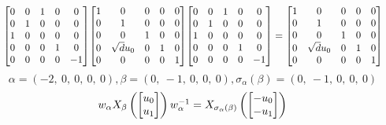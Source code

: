\documentclass[11pt]{article}
\theoremstyle{definition}
\begin{document}
\[
\scaletoalign{\textwidth}{{\left[\begin{matrix}0 & 0 & 1 & 0 & 0\\0 & 1 & 0 & 0 & 0\\1 & 0 & 0 & 0 & 0\\0 & 0 & 0 & 1 & 0\\0 & 0 & 0 & 0 & -1\end{matrix}\right]} {\left[\begin{matrix}1 & 0 & 0 & 0 & 0\\0 & 1 & 0 & 0 & 0\\0 & 0 & 1 & 0 & 0\\0 & \sqrt{d} u_{0} & 0 & 1 & 0\\0 & 0 & 0 & 0 & 1\end{matrix}\right]} {\left[\begin{matrix}0 & 0 & 1 & 0 & 0\\0 & 1 & 0 & 0 & 0\\1 & 0 & 0 & 0 & 0\\0 & 0 & 0 & 1 & 0\\0 & 0 & 0 & 0 & -1\end{matrix}\right]} = {\left[\begin{matrix}1 & 0 & 0 & 0 & 0\\0 & 1 & 0 & 0 & 0\\0 & 0 & 1 & 0 & 0\\0 & \sqrt{d} u_{0} & 0 & 1 & 0\\0 & 0 & 0 & 0 & 1\end{matrix}\right]}}
\]
\[
\alpha = \left( -2, \  0, \  0, \  0, \  0\right), \beta = \left( 0, \  -1, \  0, \  0, \  0\right), \sigma_{\alpha}(\beta) = \left( 0, \  -1, \  0, \  0, \  0\right)
\]
\[
\scaletoalign{\textwidth}{w_{\alpha} X_{\beta}\left(\left[\begin{matrix}u_{0}\\u_{1}\end{matrix}\right]\right) w_{\alpha}^{-1} = X_{\sigma_{\alpha}\left(\beta\right)}\left(\left[\begin{matrix}- u_{0}\\- u_{1}\end{matrix}\right]\right)}
\]
\end{document}
